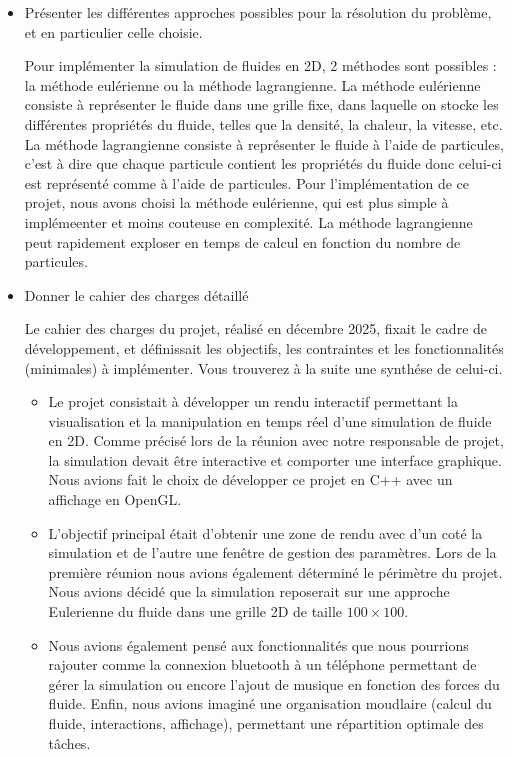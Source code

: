 \documentclass[a4paper]{article}
\begin{document}
\begin{itemize}
\item	Présenter les différentes approches possibles pour la résolution du problème, et en particulier celle choisie.

        {\color{red} Pour implémenter la simulation de fluides en 2D, 2 méthodes sont possibles : la méthode eulérienne ou la méthode lagrangienne.
        La méthode eulérienne consiste à représenter le fluide dans une grille fixe, dans laquelle on stocke les différentes propriétés du fluide, telles que la densité, la chaleur, la vitesse, etc.
        La méthode lagrangienne consiste à représenter le fluide à l'aide de particules, c'est à dire que chaque particule contient les propriétés du fluide donc celui-ci est représenté comme
        à l'aide de particules.}
        {\color{red}Pour l'implémentation de ce projet, nous avons choisi la méthode eulérienne, qui est plus simple à implémeenter et moins couteuse en complexité. La méthode 
        lagrangienne peut rapidement exploser en temps de calcul en fonction du nombre de particules.}

\item Donner le cahier des charges détaillé \\
    {\color{olive} Le cahier des charges du projet, réalisé en décembre 2025,
    fixait le cadre de développement, et définissait les objectifs, les contraintes 
    et les fonctionnalités (minimales) à implémenter. Vous trouverez à la suite une synthése de celui-ci.
    \begin{itemize}
    \item Le projet consistait à développer un rendu interactif permettant
    la visualisation et la manipulation en temps réel d'une simulation de fluide
    en 2D. Comme précisé lors de la réunion avec notre responsable de projet,
    la simulation devait être interactive et comporter une interface graphique.
    Nous avions fait le choix de développer ce projet en C++ avec un affichage en OpenGL.
    \item L'objectif principal était d'obtenir une zone de rendu avec d'un coté la 
    simulation et de l'autre une fenêtre de gestion des paramètres. Lors de la 
    première réunion nous avions également déterminé le périmètre du projet. 
    Nous avions décidé que la simulation reposerait sur une approche 
    Eulerienne du fluide dans une grille 2D de taille $100 \times 100$. 
    \item Nous avions également 
    pensé aux fonctionnalités que nous pourrions rajouter comme la connexion
    bluetooth à un téléphone permettant de gérer la simulation ou encore 
    l'ajout de musique en fonction des forces du fluide. Enfin, nous avions 
    imaginé une organisation moudlaire (calcul du fluide, interactions, affichage), 
    permettant une répartition optimale des tâches. \end{itemize}
    }
    

\end{itemize}
\end{document}
